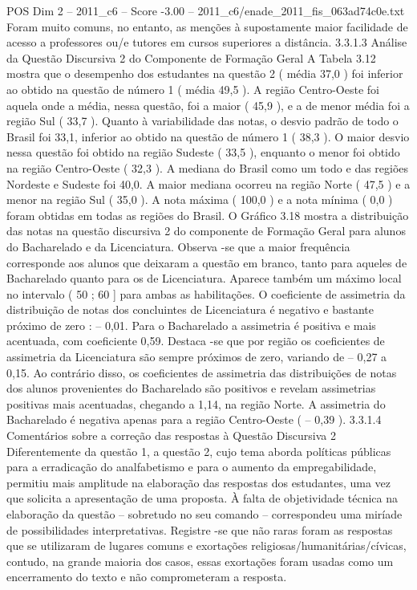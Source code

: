 \begin{textsample}{POS Dim 2 – 2011\_c6 – Score -3.00 – 2011\_c6/enade\_2011\_fis\_063ad74c0e.txt}
Foram muito comuns, no entanto, as menções à supostamente maior facilidade de acesso a professores ou/e tutores em cursos superiores a distância. 3.3.1.3 Análise da Questão Discursiva 2 do Componente de Formação Geral A Tabela 3.12 mostra que o desempenho dos estudantes na questão 2 ( média 37,0 ) foi inferior ao obtido na questão de número 1 ( média 49,5 ).
A região Centro-Oeste foi aquela onde a média, nessa questão, foi a maior ( 45,9 ), e a de menor média foi a região Sul ( 33,7 ).
Quanto à variabilidade das notas, o desvio padrão de todo o Brasil foi 33,1, inferior ao obtido na questão de número 1 ( 38,3 ).
O maior desvio nessa questão foi obtido na região Sudeste ( 33,5 ), enquanto o menor foi obtido na região Centro-Oeste ( 32,3 ).
A mediana do Brasil como um todo e das regiões Nordeste e Sudeste foi 40,0.
A maior mediana ocorreu na região Norte ( 47,5 ) e a menor na região Sul ( 35,0 ).
A nota máxima ( 100,0 ) e a nota mínima ( 0,0 ) foram obtidas em todas as regiões do Brasil.
O Gráfico 3.18 mostra a distribuição das notas na questão discursiva 2 do componente de Formação Geral para alunos do Bacharelado e da Licenciatura.
Observa -se que a maior frequência corresponde aos alunos que deixaram a questão em branco, tanto para aqueles de Bacharelado quanto para os de Licenciatura.
Aparece também um máximo local no intervalo ( 50 ; 60 ] para ambas as habilitações.
O coeficiente de assimetria da distribuição de notas dos concluintes de Licenciatura é negativo e bastante próximo de zero : – 0,01.
Para o Bacharelado a assimetria é positiva e mais acentuada, com coeficiente 0,59.
Destaca -se que por região os coeficientes de assimetria da Licenciatura são sempre próximos de zero, variando de – 0,27 a 0,15.
Ao contrário disso, os coeficientes de assimetria das distribuições de notas dos alunos provenientes do Bacharelado são positivos e revelam assimetrias positivas mais acentuadas, chegando a 1,14, na região Norte.
A assimetria do Bacharelado é negativa apenas para a região Centro-Oeste ( – 0,39 ). 3.3.1.4 Comentários sobre a correção das respostas à Questão Discursiva 2 Diferentemente da questão 1, a questão 2, cujo tema aborda políticas públicas para a erradicação do analfabetismo e para o aumento da empregabilidade, permitiu mais amplitude na elaboração das respostas dos estudantes, uma vez que solicita a apresentação de uma proposta.
À falta de objetividade técnica na elaboração da questão – sobretudo no seu comando – correspondeu uma miríade de possibilidades interpretativas.
Registre -se que não raras foram as respostas que se utilizaram de lugares comuns e exortações religiosas/humanitárias/cívicas, contudo, na grande maioria dos casos, essas exortações foram usadas como um encerramento do texto e não comprometeram a resposta.

\end{textsample}
